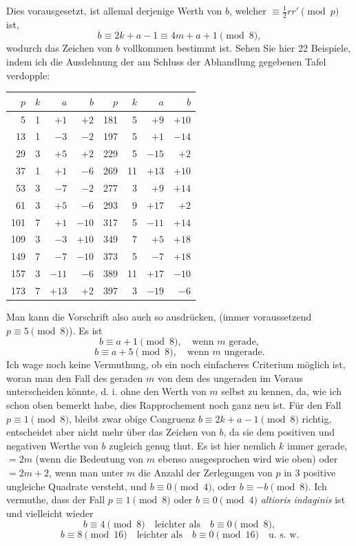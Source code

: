 \documentclass[11pt]{article}
\begin{document}
Dies vorausgesetzt, ist allemal derjenige Werth von $b$, welcher $\equiv\frac12 rr'\pmod p$ ist,
\[
 b\equiv 2k+a-1\equiv 4m+a+1 \pmod 8,
\]
wodurch das Zeichen von $b$ vollkommen bestimmt ist. Sehen Sie hier 22 Beispiele, indem ich die Ausdehnung der am Schluss der Abhandlung gegebenen Tafel verdopple:

\begin{center}\small
\begin{tabular}{rrrr|rrrr}
\toprule
$p$&$k$&$a$&$b$&$p$&$k$&$a$&$b$\\
\midrule
5&1&$+1$&$+2$&181&5&$+9$&$+10$\\
13&1&$-3$&$-2$&197&5&$+1$&$-14$\\
29&3&$+5$&$+2$&229&5&$-15$&$+2$\\
37&1&$+1$&$-6$&269&11&$+13$&$+10$\\
53&3&$-7$&$-2$&277&3&$+9$&$+14$\\
61&3&$+5$&$-6$&293&9&$+17$&$+2$\\
101&7&$+1$&$-10$&317&5&$-11$&$+14$\\
109&3&$-3$&$+10$&349&7&$+5$&$+18$\\
149&7&$-7$&$-10$&373&5&$-7$&$+18$\\
157&3&$-11$&$-6$&389&11&$+17$&$-10$\\
173&7&$+13$&$+2$&397&3&$-19$&$-6$\\
\bottomrule
\end{tabular}\end{center}

Man kann die Vorschrift also auch so ausdrücken, (immer voraussetzend $p\equiv5\pmod 8$). Es ist
\[
 b\equiv a+1 \pmod 8,\quad \text{wenn }m\text{ gerade},
\]
\[
 b\equiv a+5 \pmod 8,\quad \text{wenn }m\text{ ungerade}.
\]
Ich wage noch keine Vermuthung, ob ein noch einfacheres Criterium möglich ist, woran man den Fall des geraden $m$ von dem des ungeraden im Voraus unterscheiden könnte, d. i. ohne den Werth von $m$ selbst zu kennen, da, wie ich schon oben bemerkt habe, dies Rapprochement noch ganz neu ist. Für den Fall $p\equiv1\pmod 8$, bleibt zwar obige Congruenz $b\equiv2k+a-1\pmod 8$ richtig, entscheidet aber nicht mehr über das Zeichen von $b$, da sie dem positiven und negativen Werthe von $b$ zugleich genug thut. Es ist hier nemlich $k$ immer gerade, $=2m$ (wenn die Bedeutung von $m$ ebenso ausgesprochen wird wie oben) oder $=2m+2$, wenn man unter $m$ die Anzahl der Zerlegungen von $p$ in 3 positive ungleiche Quadrate versteht, und $b\equiv0\pmod4$, oder $b\equiv -b\pmod8$. Ich vermuthe, dass der Fall $p\equiv1\pmod8$ oder $b\equiv0\pmod4$ \emph{altioris indaginis} ist und vielleicht wieder
\[
 b\equiv4\pmod 8\quad\text{leichter als}\quad b\equiv0\pmod8,
\]
\[
 b\equiv8\pmod {16}\quad\text{leichter als}\quad b\equiv0\pmod{16}\quad \text{u. s. w.}
\]
\end{document}
